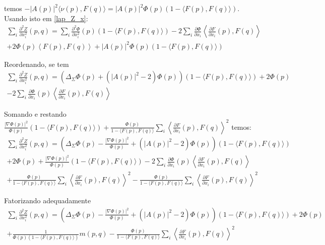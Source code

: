 \begin{demonstracao}
	temos $-|A(p)|^2 \langle \nu(p), F(q) \rangle = |A(p)|^2 \Phi(p) (1 - \langle F(p), F(q) \rangle)$. Usando isto em \ref{lap_Z_x}:
	\begin{multline*}
	\sum_i \frac{\partial^2 Z}{\partial x_i^2}(p,q) =  \sum_i \frac{\partial^2 \Phi}{\partial x_i^2}(p)(1 - \langle F(p), F(q) \rangle) -2  \sum_i \frac{\partial \Phi}{\partial x_i} \left\langle \frac{\partial F}{\partial x_i}(p), F(q) \right\rangle\\
	+ 2  \Phi(p) \left\langle F(p), F(q) \right\rangle + |A(p)|^2 \Phi(p) (1 - \langle F(p), F(q) \rangle)
	\end{multline*}
	
	Reordenando, se tem
	\begin{multline*}
		\sum_i \frac{\partial^2 Z}{\partial x_i^2}(p,q) = (\Delta_{\Sigma} \Phi(p) + (|A(p)|^2 - 2)\Phi(p))(1 - \langle F(p), F(q) \rangle) + 2 \Phi(p)\\
		- 2 \sum_i \frac{\partial \Phi}{\partial x_i}(p) \left\langle \frac{\partial F}{\partial x_i}(p), F(q) \right\rangle
	\end{multline*}
	
	Somando e restando $\frac{|\nabla \Phi(p)|^2}{\Phi(p)} (1 - \langle F(p), F(q) \rangle) + \frac{\Phi(p)}{1 - \langle F(p),F(q) \rangle} \sum_i \left\langle \frac{\partial F}{\partial x_i} (p), F(q) \right\rangle^2$ temos:
	\begin{multline*}
		\sum_i \frac{\partial^2 Z}{\partial x_i^2}(p,q) = \left(\Delta_{\Sigma} \Phi(p) - \frac{|\nabla \Phi(p)|^2}{\Phi(p)} + (|A(p)|^2 - 2)\Phi(p)\right)(1 - \langle F(p), F(q) \rangle)\\
		+ 2 \Phi(p) + \frac{|\nabla \Phi(p)|^2}{\Phi(p)} (1 - \langle F(p), F(q) \rangle) - 2 \sum_i \frac{\partial \Phi}{\partial x_i}(p) \left\langle \frac{\partial F}{\partial x_i}(p), F(q) \right\rangle\\
		+ \frac{\Phi(p)}{1 - \langle F(p),F(q) \rangle} \sum_i \left\langle \frac{\partial F}{\partial x_i} (p), F(q) \right\rangle^2 - \frac{\Phi(p)}{1 - \langle F(p),F(q) \rangle} \sum_i \left\langle \frac{\partial F}{\partial x_i} (p), F(q) \right\rangle^2
	\end{multline*}
	
	Fatorizando adequadamente
	\begin{multline*}
		\sum_i \frac{\partial^2 Z}{\partial x_i^2}(p,q) = \left(\Delta_{\Sigma} \Phi(p) - \frac{|\nabla \Phi(p)|^2}{\Phi(p)} + (|A(p)|^2 - 2)\Phi(p)\right)(1 - \langle F(p), F(q) \rangle)+ 2 \Phi(p)	\\
		+ \frac{1}{\Phi(p)(1 - \langle F(p), F(q) \rangle)}	m(p,q) - \frac{\Phi(p)}{1 - \langle F(p),F(q) \rangle} \sum_i \left\langle \frac{\partial F}{\partial x_i} (p), F(q) \right\rangle^2
	\end{multline*}
	

\end{demonstracao}
